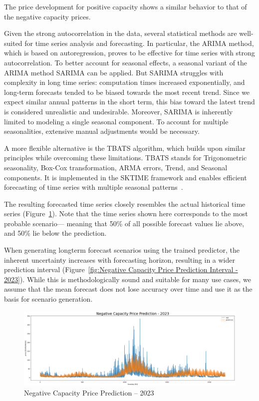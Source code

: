 The price development for positive capacity shows a similar behavior
to that of the negative capacity prices.

Given the strong autocorrelation in the data, several statistical methods are well-suited
for time series analysis and forecasting. In particular, the ARIMA method,
which is based on autoregression, proves to be effective for time series
with strong autocorrelation. To better account for seasonal effects,
a seasonal variant of the ARIMA method SARIMA can be applied.
But SARIMA struggles with complexity in long time series:
computation times increased exponentially, and long-term forecasts tended to be biased
towards the most recent trend.
Since we expect similar annual patterns in the short term, this bias toward the latest trend
is considered unrealistic and undesirable.
Moreover, SARIMA is inherently limited to modeling a single seasonal component.
To account for multiple seasonalities, extensive manual adjustments would be necessary.

A more flexible alternative is the TBATS algorithm, which builds upon similar principles
while overcoming these limitations. TBATS stands for Trigonometric seasonality,
Box-Cox transformation, ARMA errors, Trend, and Seasonal components.
It is implemented in the SKTIME framework and enables efficient forecasting
of time series with multiple seasonal patterns~\cite{.05.04.2025}.

The resulting forecasted time series closely resembles the actual historical time series
(Figure~\ref{fig:Negative Capacity Price Prediction - 2023}).
Note that the time series shown here corresponds to the most probable scenario—
meaning that 50\% of all possible forecast values lie above, and 50\% lie below the prediction.

When generating longterm forecast scenarios using the trained predictor,
the inherent uncertainty increases with forecasting horizon,
resulting in a wider prediction interval
(Figure~\ref{fig:Negative Capacity Price Prediction Interval - 2023}).
While this is methodologically sound and suitable for many use cases,
we assume that the mean forecast does not lose accuracy over time
and use it as the basis for scenario generation.

\begin{figure}[!h]
	\centering
	\includegraphics[width=1\linewidth]{pictures/RL/Negative Capacity Price Prediction - 2023.png}
	\caption{Negative Capacity Price Prediction – 2023}
	\label{fig:Negative Capacity Price Prediction - 2023}
\end{figure}

